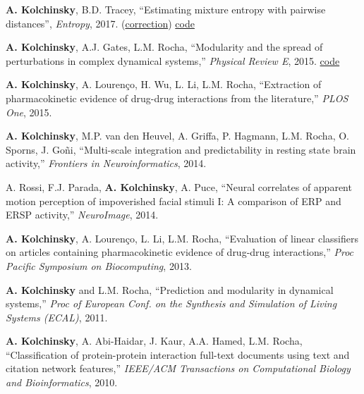 \textbf{A. Kolchinsky}, B.D. Tracey, ``Estimating mixture entropy with pairwise distances'', \emph{Entropy}, 2017.
(\href{https://www.mdpi.com/1099-4300/19/11/588}{correction}) 
\href{https://github.com/btracey/mixent/}{code}


\textbf{A. Kolchinsky}, A.J. Gates, L.M. Rocha, ``Modularity and
the spread of perturbations in complex dynamical systems,'' \emph{Physical Review E}, 2015. 
\href{https://github.com/artemyk/perturbationmodularity/}{code}

\textbf{A. Kolchinsky}, A. Lourenço, H. Wu, L. Li, L.M. Rocha,
``Extraction of pharmacokinetic evidence of drug-drug interactions
from the literature,'' \emph{PLOS One}, 2015. 

\textbf{A. Kolchinsky}, M.P. van den Heuvel, A. Griffa, P. Hagmann, L.M. Rocha, O. Sporns, J. Goñi, ``Multi-scale
integration and predictability in resting state brain activity,'' 
\emph{Frontiers in Neuroinformatics}, 2014. 

A. Rossi, F.J. Parada, \textbf{A. Kolchinsky}, A. Puce, ``Neural correlates of apparent motion perception of impoverished facial stimuli I: A comparison of ERP and ERSP activity,'' \emph{NeuroImage}, 2014. 

\textbf{A. Kolchinsky}, A. Lourenço, L. Li, L.M. Rocha, ``Evaluation of linear classifiers on articles containing pharmacokinetic evidence of drug-drug interactions,'' \emph{Proc Pacific Symposium on Biocomputing}, 2013. 

\textbf{A. Kolchinsky} and L.M. Rocha, ``Prediction and modularity in dynamical systems,'' \emph{Proc
of European Conf. on the Synthesis and Simulation of Living Systems (ECAL)}, 2011. 

\textbf{A. Kolchinsky}, A. Abi-Haidar, J. Kaur, A.A. Hamed, L.M. Rocha, ``Classification of protein-protein interaction full-text documents using text and citation network features,'' \emph{IEEE/ACM Transactions on Computational Biology and Bioinformatics}, 2010. 

